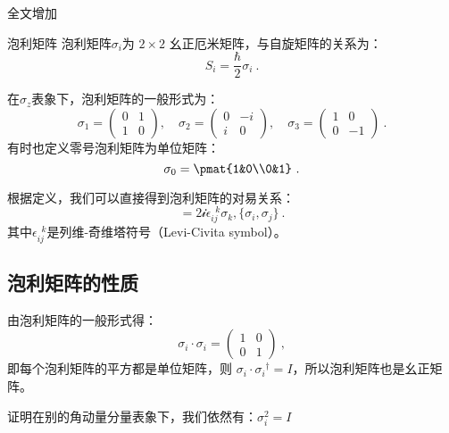 
\begin{issues}
\issueDraft 全文增加\hat
\end{issues}


\begin{definition}{泡利矩阵}\label{def_pauliM_1}
泡利矩阵$\sigma_i$为 $2\times 2$ 幺正厄米矩阵，与自旋矩阵的关系为：
\begin{equation}
S_i=\frac{\hbar}{2}\sigma_i~.
\end{equation}
\end{definition}
在$\sigma_z$表象下，泡利矩阵的一般形式为：
\begin{equation}
\sigma_1 = \begin{pmatrix}
0 & 1\\
1 & 0
\end{pmatrix},\quad 
\sigma_2 = \begin{pmatrix}
0 & -i\\
i & 0
\end{pmatrix},\quad 
\sigma_3 = 
\begin{pmatrix}
1 & 0\\
0 & -1
\end{pmatrix}
~.
\end{equation}
有时也定义零号泡利矩阵为单位矩阵：
\begin{equation}
\sigma_0 = \pmat{1&0\\0&1}~.
\end{equation}

根据定义，我们可以直接得到泡利矩阵的对易关系：
\begin{equation}
[\sigma_i,\sigma_j]=2\mathcal i\epsilon ^{\,\,\, k}_{ij}\sigma_k,\{\sigma_i,\sigma_j\}~.
\end{equation}
其中$\epsilon ^{\,\,\, k}_{ij}$是列维-奇维塔符号（Levi-Civita symbol）。

\subsection{泡利矩阵的性质}
由泡利矩阵的一般形式得：
\begin{equation}
\sigma_i\cdot \sigma_i = \begin{pmatrix}1&0\\0&1\end{pmatrix}~,
\end{equation}
即每个泡利矩阵的平方都是单位矩阵，则 $\sigma_i \cdot  \sigma_i{}^\dagger = I$，所以泡利矩阵也是幺正矩阵。
\begin{exercise}{}
证明在别的角动量分量表象下，我们依然有：$\sigma_i^2=I$
\end{exercise}

